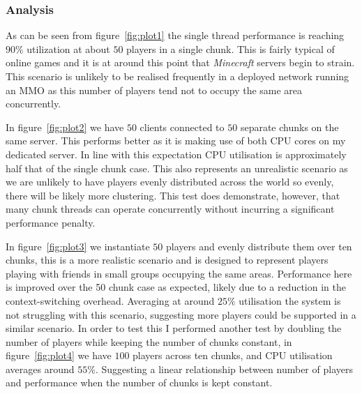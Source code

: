\documentclass[12pt,notitlepage,a4paper]{report}
\begin{document}
	\subsubsection{Analysis}
	As can be seen from figure~\ref{fig:plot1} the single thread performance is reaching $90\%$ utilization at about $50$ players in a single chunk. This is fairly typical of online games and it is at around this point that \emph{Minecraft} servers begin to strain. This scenario is unlikely to be realised frequently in a deployed network running an MMO as this number of players tend not to occupy the same area concurrently.
	
	In figure~\ref{fig:plot2} we have $50$ clients connected to $50$ separate chunks on the same server. This performs better as it is making use of both CPU cores on my dedicated server. In line with this expectation CPU utilisation is approximately half that of the single chunk case. This also represents an unrealistic scenario as we are unlikely to have players evenly distributed across the world so evenly, there will be likely more clustering. This test does demonstrate, however, that many chunk threads can operate concurrently without incurring a significant performance penalty.
	
	In figure~\ref{fig:plot3} we instantiate $50$ players and evenly distribute them over ten chunks, this is a more realistic scenario and is designed to represent players playing with friends in small groups occupying the same areas. Performance here is improved over the 50 chunk case as expected, likely due to a reduction in the context-switching overhead. Averaging at around $25\%$ utilisation the system is not struggling with this scenario, suggesting more players could be supported in a similar scenario. In order to test this I performed another test by doubling the number of players while keeping the number of chunks constant, in figure~\ref{fig:plot4} we have $100$ players across ten chunks, and CPU utilisation averages around $55\%$. Suggesting a linear relationship between number of players and performance when the number of chunks is kept constant.
	
\end{document}
